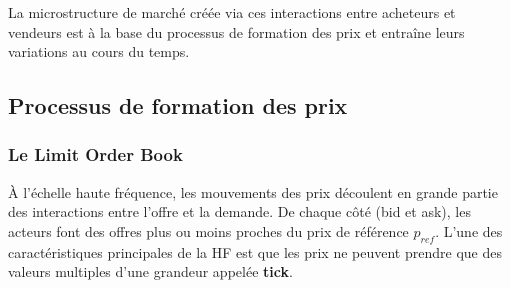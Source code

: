 \documentclass[12pt,a4paper]{article}
\theoremstyle{definition}
\theoremstyle{remark}
\begin{document}
    La microstructure de marché créée via ces interactions entre acheteurs et vendeurs est à la base du processus de formation des prix et entraîne leurs variations au cours du temps.

    \subsection{Processus de formation des prix}
    \subsubsection{Le Limit Order Book}
    À l'échelle haute fréquence, les mouvements des prix découlent en grande partie des interactions entre l'offre et la demande. De chaque côté (bid et ask), les acteurs font des offres plus ou moins proches du prix de référence $p_{ref}$. L'une des caractéristiques principales de la HF est que les prix ne peuvent prendre que des valeurs multiples d'une grandeur appelée \textbf{tick}. 
    
\end{document}
